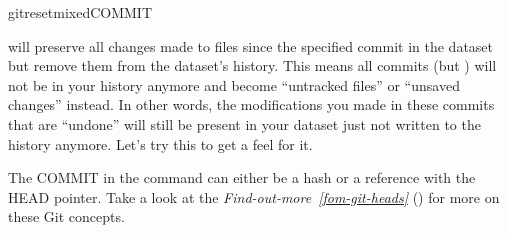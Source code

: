 \begin{sphinxVerbatim}[commandchars=\\\{\}]
gitreset\PYGZhy{}\PYGZhy{}mixedCOMMIT
\end{sphinxVerbatim}

\sphinxAtStartPar
will preserve all changes made to files since the specified
commit in the dataset but remove them from the dataset’s history.
This means all commits   (but  )
will not be in your history anymore and become “untracked files” or
“unsaved changes” instead. In other words, the modifications
you made in these commits that are “undone” will still be present
in your dataset \textendash{} just not written to the history anymore. Let’s
try this to get a feel for it.

\sphinxAtStartPar
The COMMIT in the command can either be a hash or a reference
with the HEAD pointer. Take a look at the \textit{Find-out-more}~{\findoutmoreiconinline}\textit{\ref{fom-git-heads}} {\hyperref[\detokenize{basics/101-137-history:fom-git-heads}]{}} () for more on these Git concepts.

